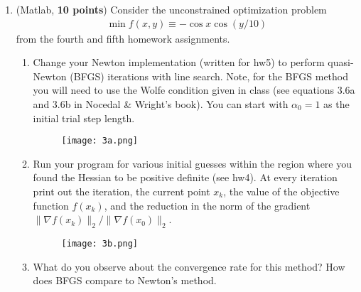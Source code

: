 \documentclass[11pt]{article}
\begin{document}
\begin{enumerate}
\begin{enumerate}
    
  \end{enumerate}




  
 \item (Matlab, {\bf 10 points}) Consider the unconstrained
  optimization problem
  \begin{align}
  \min f(x,y) \equiv - \cos x \cos (y/10)
  \end{align}
  from the fourth and fifth homework assignments.
  
  \begin{enumerate}
  
  \item Change your Newton implementation (written for hw5) to perform
    quasi-Newton (BFGS) iterations with line search. Note, for the
    BFGS method you will need to use the Wolfe condition given in
    class (see equations 3.6a and 3.6b in Nocedal \& Wright's
    book). You can start with $\alpha_0 = 1$ as the initial trial step
    length.



    \begin{figure}[H]
    \centering
    \texttt{[image: 3a.png]} 
    \end{figure}

    
  \item Run your program for various initial guesses within the region
    where you found the Hessian to be positive definite (see hw4).  At
    every iteration print out the iteration, the current point $x_k$,
    the value of the objective function $f(x_k)$, and the reduction in
    the norm of the gradient $ \|\nabla f(x_k)\|_2/ \|\nabla
    f(x_0)\|_2$.

    \begin{figure}[H]
    \centering
    \texttt{[image: 3b.png]} 
    \end{figure}

    
  \item What do you observe about the convergence rate for this
    method? How does BFGS compare to Newton's method.


\end{enumerate}
\end{enumerate}
\end{document}
